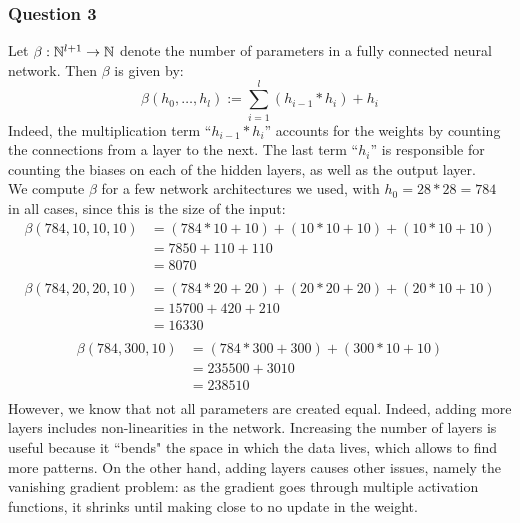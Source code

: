 \documentclass[12pt]{article}
\begin{document}
\subsubsection{Question 3}
Let $\beta: \mathbb{N}^{l+1} \to \mathbb{N}$ denote the number of parameters in a fully connected neural network. Then $\beta$ is given by:
\begin{equation}
  \beta(h_0, \ldots, h_l) := \sum_{i=1}^{l} (h_{i-1} * h_{i}) + h_i
\end{equation}
Indeed, the multiplication term ``$h_{i-1} * h_{i}$'' accounts for the weights by counting the connections from a layer to the next.
The last term ``$h_i$'' is responsible for counting the biases on each of the hidden layers, as well as the output layer. \\
We compute $\beta$ for a few network architectures we used, with $h_0 = 28 * 28 = 784$ in all cases, since this is the size of the input:
\begin{align*}
  \beta(784, 10, 10, 10)
   & = (784 * 10 + 10) + (10 * 10 + 10) + (10 * 10 + 10) \\
   & = 7850 + 110 + 110                                  \\
   & = 8070                                              \\
\end{align*}
\begin{align*}
  \beta(784, 20, 20, 10)
   & = (784 * 20 + 20) + (20 * 20 + 20) + (20 * 10 + 10) \\
   & = 15700 + 420 + 210                                 \\
   & = 16330                                             \\
\end{align*}
\begin{align*}
  \beta(784, 300, 10)
   & = (784 * 300 + 300) + (300 * 10 + 10) \\
   & = 235500 + 3010                       \\
   & = 238510                              \\
\end{align*}
However, we know that not all parameters are created equal.
Indeed, adding more layers includes non-linearities in the network.
Increasing the number of layers is useful because it ``bends" the space in which the data lives, which allows to find more patterns.
On the other hand, adding layers causes other issues, namely the vanishing gradient problem: as the gradient goes through multiple activation functions, it shrinks until making close to no update in the weight.
\end{document}
